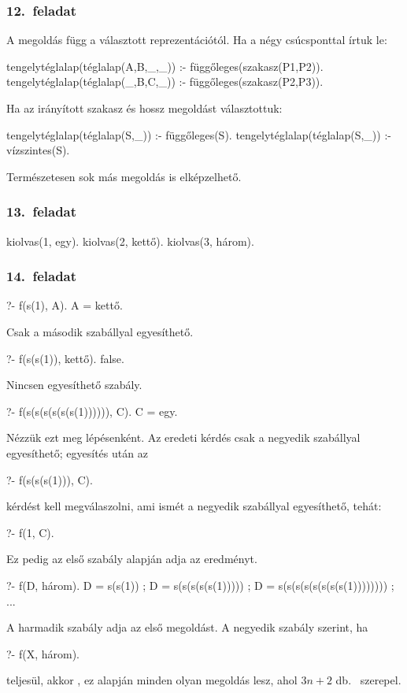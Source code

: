 \subsubsection*{12.~feladat}
A megoldás függ a választott reprezentációtól.
Ha a négy csúcsponttal
írtuk le:
\begin{program}
tengelytéglalap(téglalap(A,B,_,_)) :-
    függőleges(szakasz(P1,P2)).
tengelytéglalap(téglalap(_,B,C,_)) :-
    függőleges(szakasz(P2,P3)).
\end{program}
Ha az irányított szakasz és hossz megoldást
választottuk:
\begin{program}
tengelytéglalap(téglalap(S,_)) :- függőleges(S).
tengelytéglalap(téglalap(S,_)) :- vízszintes(S).
\end{program}
Természetesen sok más megoldás is elképzelhető.
\subsubsection*{13.~feladat}
\begin{program}
kiolvas(1, egy).
kiolvas(2, kettő).
kiolvas(3, három).
\end{program}
\subsubsection*{14.~feladat}
\begin{query}
?- f(s(1), A).
A = kettő.
\end{query}
Csak a második szabállyal egyesíthető.

\begin{query}
?- f(s(s(1)), kettő).
false.
\end{query}
Nincsen egyesíthető szabály.

\begin{query}
?- f(s(s(s(s(s(s(1)))))), C).
C = egy.
\end{query}
Nézzük ezt meg lépésenként.
Az eredeti kérdés csak a negyedik szabállyal egyesíthető;
egyesítés után az
\begin{query}
?- f(s(s(s(1))), C).
\end{query}
kérdést kell megválaszolni, ami ismét a negyedik szabállyal
egyesíthető, tehát:
\begin{query}
?- f(1, C).
\end{query}
Ez pedig az első szabály alapján adja az eredményt.

\begin{query}
?- f(D, három).
D = s(s(1)) ;
D = s(s(s(s(s(1))))) ;
D = s(s(s(s(s(s(s(s(1)))))))) ;
...
\end{query}
A harmadik szabály adja az első megoldást.
A negyedik szabály szerint, ha
\begin{query}
?- f(X, három).
\end{query}
teljesül, akkor , ez alapján
minden olyan  megoldás lesz, ahol $3n+2$ db.~
szerepel.
